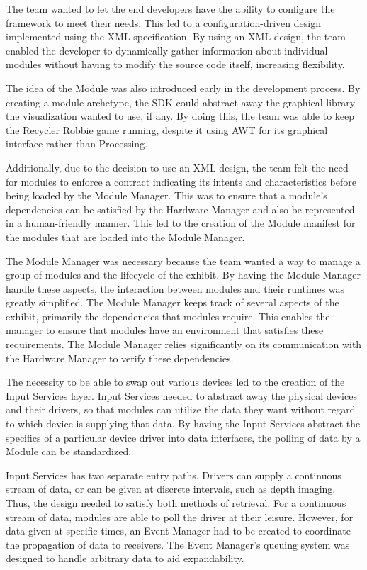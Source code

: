 \documentclass[11pt,letterpaper]{article}
\begin{document}
	The team wanted to let the end developers have the ability to configure the
	framework to meet their needs. This led to a configuration-driven design
	implemented using the XML specification. By using an XML design, the team
	enabled the developer to dynamically gather information about individual
	modules without having to modify the source code itself, increasing
	flexibility. 

	The idea of the Module was also introduced early in the development process.
	By creating a module archetype, the SDK could abstract away the graphical
	library the visualization wanted to use, if any. By doing this, the team was
	able to keep the Recycler Robbie game running, despite it using AWT for its
	graphical interface rather than Processing.

	Additionally, due to the decision to use an XML design, the team felt the need
	for modules to enforce a contract indicating its intents and characteristics
	before being loaded by the Module Manager. This was to ensure that a module's
	dependencies can be satisfied by the Hardware Manager and also be represented
	in a human-friendly manner. This led to the creation of the Module manifest
	for the modules that are loaded into the Module Manager.

	The Module Manager was necessary because the team wanted a way to manage a
	group of modules and the lifecycle of the exhibit. By having the Module
	Manager handle these aspects, the interaction between modules and their
	runtimes was greatly simplified. The Module Manager keeps track of several
	aspects of the exhibit, primarily the dependencies that modules require. This
	enables the manager to ensure that modules have an environment that satisfies
	these requirements. The Module Manager relies significantly on its
	communication with the Hardware Manager to verify these dependencies.

	The necessity to be able to swap out various devices led to the creation of
	the Input Services layer. Input Services needed to abstract away the physical
	devices and their drivers, so that modules can utilize the data they want
	without regard to which device is supplying that data. By having the Input
	Services abstract the specifics of a particular device driver into data
	interfaces, the polling of data by a Module can be standardized.

	Input Services has two separate entry paths.  Drivers can supply a continuous
	stream of data, or can be given at discrete intervals, such as depth imaging.
	Thus, the design needed to satisfy both methods of retrieval. For a continuous
	stream of data, modules are able to poll the driver at their leisure. However,
	for data given at specific times, an Event Manager had to be created to
	coordinate the propagation of data to receivers. The Event Manager's queuing
	system was designed to handle arbitrary data to aid expandability.
\end{document}
